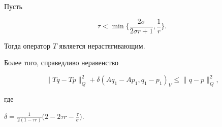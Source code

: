 \begin{thm} \label{bz_T4}


Пусть 


\begin{equation}


\tau < \min \bigg\{{\frac {2 \sigma} {2 \sigma r+1}, 


\frac {1} {r}} \bigg\}. 


\label{2bz18}


\end{equation}


Тогда оператор $T$ является нерастягивающим. 





Более того, справедливо неравенство


\begin{equation}


\| {T q-T p} \|_Q^2+


\delta (A q_1-A p_1, q_1-p_1)_V


\leq \| {q-p} \|_Q^2 ,


\label{2bz18_01}


\end{equation}


где 


$\delta= \frac{1}{2 (1-\tau r)}\big(2-2 \tau r-\frac {\tau} {\sigma}\big)$.


\end{thm}





